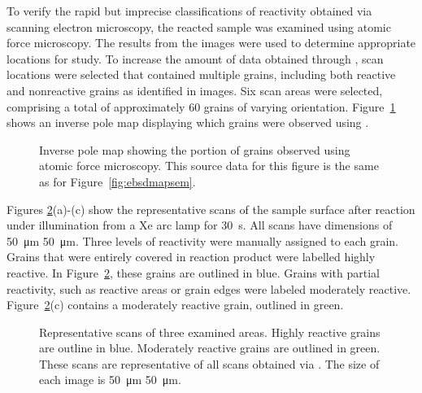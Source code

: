 \documentclass[12pt,%
              twoside,
               letterpaper]{uiothesis}
\begin{document}
To verify the rapid but imprecise classifications of reactivity obtained via
scanning electron microscopy, the reacted sample was examined using atomic force
microscopy. The results from the  images were used to determine appropriate
locations for study. To increase the amount of data obtained through , scan
locations were selected that contained multiple grains, including both reactive and
nonreactive grains as identified in  images. Six scan areas were selected,
comprising a total of approximately 60 grains of varying orientation.
Figure~\ref{fig:fe2o3afmmap} shows an inverse pole map displaying which grains were observed
using .
\begin{figure}
	\caption[Inverse pole map of grains observed using .]{%
		Inverse pole map showing the portion of grains observed using atomic force
microscopy. This source data for this 
		figure is the same as for Figure~\ref{fig:ebsdmapsem}.}
	\label{fig:fe2o3afmmap}
\end{figure}

Figures \ref{fig:fe2o3afmscans}(a)-(c) show the representative  scans of the
sample surface after reaction under illumination from a Xe arc lamp for \SI{30}{\second}.
All scans have dimensions of \SI{50}{\micro\meter} \texttimes{} \SI{50}{\micro\meter}.
Three levels of reactivity were manually assigned to each grain. Grains that were entirely
covered in reaction product were labelled highly reactive. In Figure~\ref{fig:fe2o3afmscans},
these grains are outlined in blue. Grains with partial reactivity, such as reactive areas
or grain edges were labeled moderately reactive. Figure~\ref{fig:fe2o3afmscans}(c) contains a
moderately reactive grain, outlined in green.
\begin{figure}[b]
	\caption[Representative  scans of three examined areas]{%
		Representative  scans of three examined areas. Highly reactive grains
are outline in blue. 
		Moderately reactive grains are outlined in green. These scans are representative
of all scans 
		obtained via . The size of each image is \SI{50}{\micro\meter}
\texttimes{} \SI{50}{\micro\meter}.}
	\label{fig:fe2o3afmscans}
\end{figure} 
\end{document}

